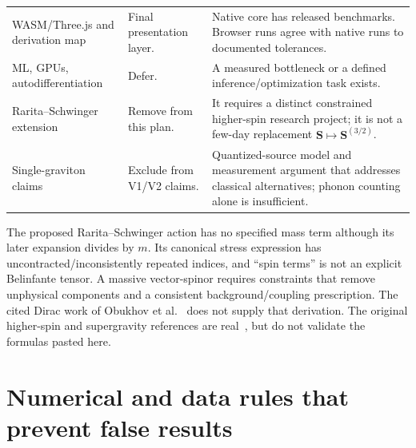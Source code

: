 \documentclass[a4paper,11pt]{article}
\begin{document}
\begin{longtable}{@{}P{39mm}P{46mm}P{68mm}@{}}
WASM/Three.js and derivation map & Final presentation layer. & Native core has released benchmarks. Browser runs agree with native runs to documented tolerances.\\
ML, GPUs, autodifferentiation & Defer. & A measured bottleneck or a defined inference/optimization task exists.\\
Rarita--Schwinger extension & Remove from this plan. & It requires a distinct constrained higher-spin research project; it is not a few-day replacement $\bm S\mapsto\bm S^{(3/2)}$.\\
Single-graviton claims & Exclude from V1/V2 claims. & Quantized-source model and measurement argument that addresses classical alternatives; phonon counting alone is insufficient.\\
\bottomrule\end{longtable}

The proposed Rarita--Schwinger action has no specified mass term although its later expansion divides by $m$. Its canonical stress expression has uncontracted/inconsistently repeated indices, and ``spin terms'' is not an explicit Belinfante tensor. A massive vector-spinor requires constraints that remove unphysical components and a consistent background/coupling prescription. The cited Dirac work of Obukhov et al.~\cite{obukhov} does not supply that derivation. The original higher-spin and supergravity references are real~\cite{rarita,deser,supergravity}, but do not validate the formulas pasted here.

\section{Numerical and data rules that prevent false results}
\label{sec:numerics}
\end{document}
